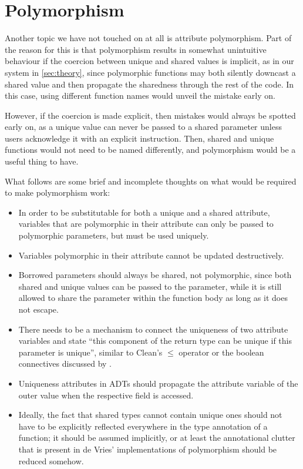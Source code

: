 \section{Polymorphism}
Another topic we have not touched on at all is attribute polymorphism. Part of the reason for this is that polymorphism results in somewhat unintuitive behaviour if the coercion between unique and shared values is implicit, as in our system in \cref{sec:theory}, since polymorphic functions may both silently downcast a shared value and then propagate the sharedness through the rest of the code. In this case, using different function names would unveil the mistake early on.

However, if the coercion is made explicit, then mistakes would always be spotted early on, as a unique value can never be passed to a shared parameter unless users acknowledge it with an explicit instruction. Then, shared and unique functions would not need to be named differently, and polymorphism would be a useful thing to have.

What follows are some brief and incomplete thoughts on what would be required to make polymorphism work:
\begin{itemize}
	\item In order to be substitutable for both a unique and a shared attribute, variables that are polymorphic in their attribute can only be passed to polymorphic parameters, but must be used uniquely.
	\item Variables polymorphic in their attribute cannot be updated destructively.
	\item Borrowed parameters should always be shared, not polymorphic, since both shared and unique values can be passed to the parameter, while it is still allowed to share the parameter within the function body as long as it does not escape.
	\item There needs to be a mechanism to connect the uniqueness of two attribute variables and state ``this component of the return type can be unique if this parameter is unique'', similar to Clean's $\leq$ operator or the boolean connectives discussed by \cite{de_vries_making_2009}.
	\item Uniqueness attributes in ADTs should propagate the attribute variable of the outer value when the respective field is accessed.
	\item Ideally, the fact that shared types cannot contain unique ones should not have to be explicitly reflected everywhere in the type annotation of a function; it should be assumed implicitly, or at least the annotational clutter that is present in de Vries' implementations of polymorphism should be reduced somehow.
\end{itemize}

